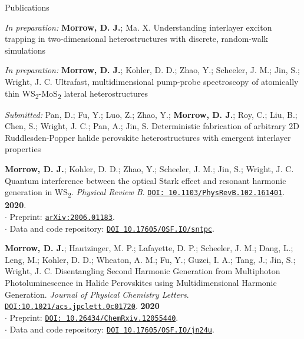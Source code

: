 \documentclass{resume} %
\begin{document}
\begin{rSection}{Publications}
	
\begin{etaremune}

	
\item[] \textit{In preparation:} \textbf{Morrow, D. J.}; Ma. X. Understanding interlayer exciton trapping in two-dimensional heterostructures with discrete, random-walk simulations
	
\item[] \textit{In preparation:} \textbf{Morrow, D. J.}; Kohler, D. D.; Zhao, Y.; Scheeler, J. M.; Jin, S.; Wright, J. C. Ultrafast, multidimensional pump-probe spectroscopy of atomically thin WS\textsubscript{2}-MoS\textsubscript{2} lateral heterostructures
	


\item[] \textit{Submitted:} Pan, D.; Fu, Y.; Luo, Z.; Zhao, Y.; \textbf{Morrow, D. J.}; Roy, C.; Liu, B.; Chen, S.; Wright, J. C.; Pan, A.; Jin, S. Deterministic fabrication of arbitrary 2D Ruddlesden-Popper halide perovskite heterostructures with emergent interlayer properties

\item \textbf{Morrow, D. J.}; Kohler, D. D.; Zhao, Y.; Scheeler, J. M.; Jin, S.; Wright, J. C.	Quantum interference between the optical Stark effect and resonant harmonic generation in WS\textsubscript{2}.  \emph{Physical Review B}. \href{https://journals.aps.org/pra/abstract/10.1103/PhysRevB.102.161401}{\texttt{DOI: 10.1103/PhysRevB.102.161401}}. \textbf{2020}.\\
$\cdot$ Preprint: \href{http://arxiv.org/abs/2006.01183}{\texttt{arXiv:2006.01183}}. \\
$\cdot$ Data and code repository: \href{https://osf.io/sntpc/}{\texttt{DOI 10.17605/OSF.IO/sntpc}}.

\item \textbf{Morrow, D. J.}; Hautzinger, M. P.; Lafayette, D. P.; Scheeler, J. M.; Dang, L.; Leng, M.; Kohler, D. D.; Wheaton, A. M.; Fu, Y.; Guzei, I. A.; Tang, J.; Jin, S.; Wright, J. C. Disentangling Second Harmonic Generation from Multiphoton Photoluminescence in Halide Perovskites using Multidimensional Harmonic Generation. \emph{Journal of Physical Chemistry Letters}. \href{https://pubs.acs.org/doi/10.1021/acs.jpclett.0c01720}{\texttt{DOI:10.1021/acs.jpclett.0c01720}}. \textbf{2020} \\
$\cdot$ Preprint: \href{https://dx.doi.org/10.26434/chemrxiv.12055440}{\texttt{DOI: 10.26434/ChemRxiv.12055440}}. \\
$\cdot$ Data and code repository: \href{https://osf.io/jn24u/}{\texttt{DOI 10.17605/OSF.IO/jn24u}}.


\end{etaremune}
\end{rSection}
\end{document}
